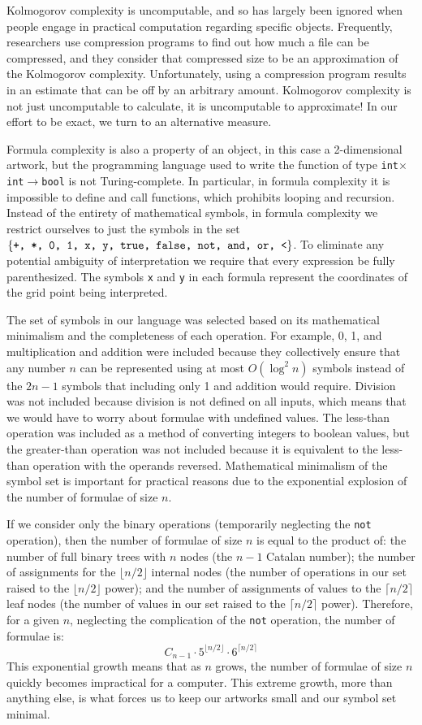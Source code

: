 \documentclass[11pt]{article}
\begin{document}
Kolmogorov complexity is uncomputable, and so has largely been ignored when
people engage in practical computation regarding specific objects.  Frequently,
researchers use compression programs to find out how much a file can be
compressed, and they consider that compressed size to be an approximation of
the Kolmogorov complexity.  Unfortunately, using a compression program results
in an estimate that can be off by an arbitrary amount.  Kolmogorov complexity
is not just uncomputable to calculate, it is uncomputable to approximate!  In
our effort to be exact, we turn to an alternative measure.

Formula complexity is also a property of an object, in this case a
2-dimensional artwork, but the programming language used to write the function
of type {\tt int$\times$int$\to$bool} is not Turing-complete.  In particular,
in formula complexity it is impossible to define and call functions, which
prohibits looping and recursion.  Instead of the entirety of mathematical
symbols, in formula complexity we restrict ourselves to just the symbols in the
set $\{\text{\tt +, *, 0, 1, x, y, true, false, not, and, or, <}\}$. To
eliminate any potential ambiguity of interpretation we require that every
expression be fully parenthesized.  The symbols {\tt x} and {\tt y} in each formula
represent the coordinates of the grid point being interpreted.  

The set of symbols in our language was selected based on its mathematical
minimalism and the completeness of each operation.  For example, 0, 1, and
multiplication and addition were included because they collectively ensure that
any number $n$ can be represented using at most $O(\log^2 n)$ symbols instead
of the $2n-1$ symbols that including only 1 and addition would require.  Division
was not included because division is not defined on all inputs, which means
that we would have to worry about formulae with undefined values.  The
less-than operation was included as a method of converting integers to boolean
values, but the greater-than operation was not included because it is
equivalent to the less-than operation with the operands reversed.  Mathematical
minimalism of the symbol set is important for practical reasons due to the
exponential explosion of the number of formulae of size $n$. 

If we consider only the binary operations (temporarily neglecting the {\tt not}
operation), then the number of formulae of size $n$ is equal to the product of:
the number of full binary trees with $n$ nodes (the $n-1$ Catalan number); the
number of assignments for the $\lfloor n/2 \rfloor$ internal nodes (the number
of operations in our set raised to the $\lfloor n/2 \rfloor$ power); and the
number of assignments of values to the $\lceil n/2 \rceil$ leaf nodes (the
number of values in our set raised to the $\lceil n/2 \rceil$ power).
Therefore, for a given $n$, neglecting the complication of the {\tt not}
operation, the number of formulae is: 
\[C_{n-1} \cdot 5^{\lfloor n/2 \rfloor} \cdot 6^{\lceil n/2 \rceil}\]
This exponential growth means that as $n$ grows, the number of formulae of size
$n$ quickly becomes impractical for a computer.  This extreme growth, more than
anything else, is what forces us to keep our artworks small and our symbol set
minimal.
\end{document}

